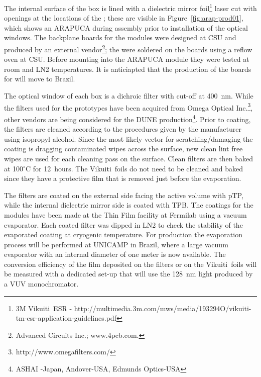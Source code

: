 The internal surface of the box is lined with a dielectric mirror foil\footnote{3M Vikuiti\texttrademark\  ESR - http://multimedia.3m.com/mws/media/193294O/vikuiti-tm-esr-application-guidelines.pdf} laser cut with openings at the locations of the ; these are visible in Figure~\ref{fig:arap-prod01}, which shows an ARAPUCA during assembly prior to installation of the optical windows. The backplane  boards for the  modules were designed at CSU and produced by an external vendor\footnote{Advanced Circuits Inc.; www.4pcb.com.}; the  were soldered on the boards using a reflow oven at CSU. Before mounting into the ARAPUCA module they were tested at room and LN2 temperatures. It is anticiapted that the production of the boards for   will move to Brazil.

The optical window of each box is a dichroic filter with cut-off at \SI{400}{nm}. While the filters used for the  prototypes have been acquired from Omega Optical Inc.\footnote{http://www.omegafilters.com/}, other vendors are being considered for the DUNE production\footnote{ASHAI -Japan, Andover-USA, Edmunds Optics-USA}.
Prior to coating, the filters are cleaned according to the procedures given by the manufacturer using isopropyl alcohol. Since the most likely vector for scratching/damaging the coating is dragging contaminated wipes across the surface, new clean lint free wipes are used for each  cleaning pass on the surface. Clean filters are then baked at 100$^\circ$C for \SI{12}{hours}. The Vikuiti\texttrademark\  foils do not need to be cleaned and baked since they have a protective film that is removed just before the evaporation.
   
The filters are coated on the external side facing the \lar active volume with pTP,
while the internal dielectric mirror side is coated with TPB.
The coatings for the  modules have been made at the Thin Film facility at Fermilab using a vacuum evaporator. Each coated filter was dipped in LN2 to check the stability of the evaporated coating at cryogenic temperature. For   production the evaporation process will be performed at UNICAMP in Brazil, where a large vacuum evaporator with an internal diameter of one meter is now available. The  conversion efficiency of the film deposited on the filters or on the Vikuiti\texttrademark\   foils will be measured with a dedicated set-up that will use the \SI{128}{nm} light produced by a VUV monochromator.


